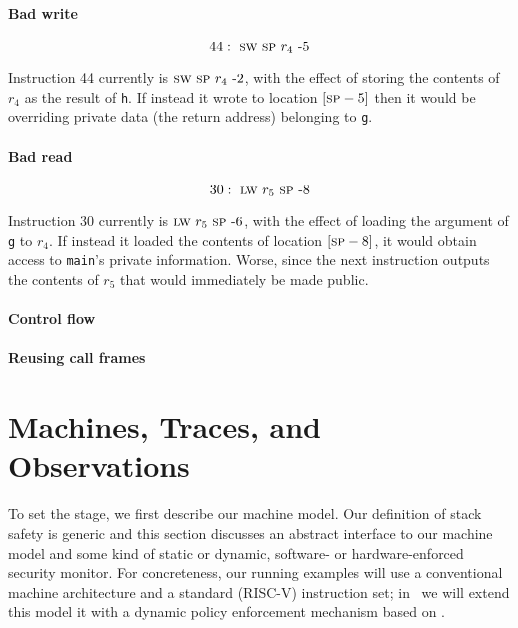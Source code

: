 \documentclass[acmsmall,review,anonymous]{acmart}\settopmatter{printfolios=true,printccs=false,printacmref=false}
\begin{document}

\paragraph*{Bad write}

\[
44 : ~ \textsc{sw} ~ \textsc{sp} ~ r_4 ~ \textrm{-} 5
\]

Instruction 44 currently is $\textsc{sw} ~ \textsc{sp} ~ r_4 ~ \textrm{-} 2$, with the
effect of storing the contents of $r_4$ as the result of {\tt h}. If
instead it wrote to location $[\textsc{sp} - 5]$ then it would be overriding
private data (the return address) belonging to {\tt g}.

\paragraph*{Bad read}

\[
30 : ~ \textsc{lw} ~ r_5 ~ \textsc{sp} ~ \textrm{-} 8
\]

Instruction 30 currently is $\textsc{lw} ~ r_5 ~ \textsc{sp} ~ \textrm{-} 6$, with the
effect of loading the argument of {\tt g} to $r_4$. If instead it
loaded the contents of location $[\textsc{sp} - 8]$, it would obtain access
to {\tt main}'s private information. Worse, since the next instruction
outputs the contents of $r_5$ that would immediately be made public.

\paragraph*{Control flow}


\paragraph*{Reusing call frames}


\section{Machines, Traces, and Observations}
\label{sec:prelim}

To set the stage, we first describe our machine model. Our definition
of stack safety is generic and this section discusses an abstract
interface to our machine model and some kind of static or dynamic,
software- or hardware-enforced security monitor.  For concreteness,
our running examples will use a conventional machine architecture and
a standard (RISC-V) instruction set; in~ we
will extend this model it with a dynamic policy enforcement mechanism
based on .
\end{document}
